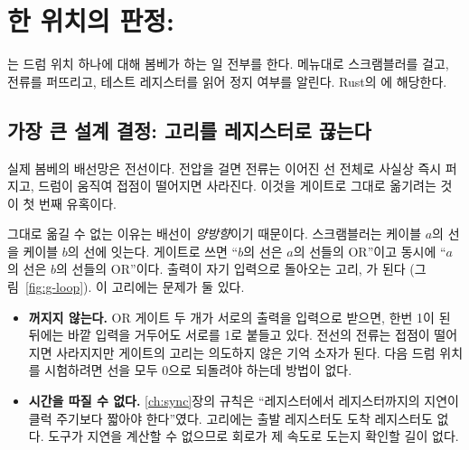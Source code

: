 \chapter{한 위치의 판정: \texorpdfstring{}{bombe\_core}}\label{ch:rtl-core}

는 드럼 위치 하나에 대해 봄베가 하는 일 전부를 한다. 메뉴대로 스크램블러를 걸고, 전류를
퍼뜨리고, 테스트 레지스터를 읽어 정지 여부를 알린다. Rust의 에 해당한다.

\section{가장 큰 설계 결정: 고리를 레지스터로 끊는다}

실제 봄베의 배선망은 전선이다. 전압을 걸면 전류는 이어진 선 전체로 사실상 즉시 퍼지고, 드럼이 움직여 접점이
떨어지면 사라진다. 이것을 게이트로 그대로 옮기려는 것이 첫 번째 유혹이다.

\Why 그대로 옮길 수 없는 이유는 배선이 \emph{양방향}이기 때문이다. 스크램블러는 케이블 $a$의 선을 케이블 $b$의
선에 잇는다. 게이트로 쓰면 ``$b$의 선은 $a$의 선들의 OR''이고 동시에 ``$a$의 선은 $b$의 선들의 OR''이다.
출력이 자기 입력으로 돌아오는 고리, 가 된다
(그림~\ref{fig:g-loop}). 이 고리에는 문제가 둘 있다.

\begin{itemize}
\item \textbf{꺼지지 않는다.} OR 게이트 두 개가 서로의 출력을 입력으로 받으면, 한번 1이 된 뒤에는 바깥 입력을
거두어도 서로를 1로 붙들고 있다. 전선의 전류는 접점이 떨어지면 사라지지만 게이트의 고리는 의도하지 않은
기억 소자가 된다. 다음 드럼 위치를 시험하려면 선을 모두 0으로 되돌려야 하는데 방법이 없다.
\item \textbf{시간을 따질 수 없다.} \ref{ch:sync}장의 규칙은 ``레지스터에서 레지스터까지의 지연이 클럭
주기보다 짧아야 한다''였다. 고리에는 출발 레지스터도 도착 레지스터도 없다. 도구가 지연을 계산할 수 없으므로
회로가 제 속도로 도는지 확인할 길이 없다.
\end{itemize}

